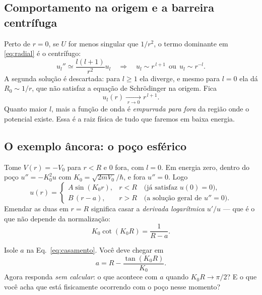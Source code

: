 \documentclass[11pt,a4paper]{article}
\begin{document}
\subsection{Comportamento na origem e a barreira centrífuga}

Perto de $r=0$, se $U$ for menos singular que $1/r^{2}$, o termo dominante em
\eqref{eq:radial} é o centrífugo:
\begin{equation}
u_{l}'' \simeq \frac{l(l+1)}{r^{2}}u_{l}
\quad\Longrightarrow\quad
u_{l}\sim r^{\,l+1} \ \ \text{ou}\ \ u_{l}\sim r^{-l}.
\end{equation}
A segunda solução é descartada: para $l\ge1$ ela diverge, e mesmo para $l=0$ ela dá
$R_{0}\sim 1/r$, que não satisfaz a equação de Schrödinger na origem. Fica
\begin{equation}
u_{l}(r) \xrightarrow[\;r\to0\;]{} r^{\,l+1}.
\label{eq:origem}
\end{equation}
Quanto maior $l$, mais a função de onda é \emph{empurrada para fora} da região onde o
potencial existe. Essa é a raiz física de tudo que faremos em baixa energia.

\subsection{O exemplo âncora: o poço esférico}

Tome $V(r) = -V_{0}$ para $r<R$ e $0$ fora, com $l=0$. Em energia zero, dentro do poço
$u'' = -K_{0}^{2}u$ com $K_{0}=\sqrt{2mV_{0}}/\hbar$, e fora $u''=0$. Logo
\begin{equation}
u(r) = \begin{cases}
A\sin(K_{0}r), & r<R \quad\text{(já satisfaz } u(0)=0),\\[4pt]
B\,(r-a), & r>R \quad\text{(a solução geral de } u''=0).
\end{cases}
\end{equation}
Emendar as duas em $r=R$ significa casar a \emph{derivada logarítmica} $u'/u$ — que é
o que não depende da normalização:
\begin{equation}
K_{0}\cot(K_{0}R) = \frac{1}{R-a}.
\label{eq:casamento}
\end{equation}

\begin{suavez}
Isole $a$ na Eq.~\eqref{eq:casamento}. Você deve chegar em
\[
a = R - \frac{\tan(K_{0}R)}{K_{0}}.
\]
Agora responda \emph{sem calcular}: o que acontece com $a$ quando $K_{0}R\to\pi/2$?
E o que você acha que está fisicamente ocorrendo com o poço nesse momento?

\vspace{2.2cm}
\hrulefill
\end{suavez}
\end{document}
